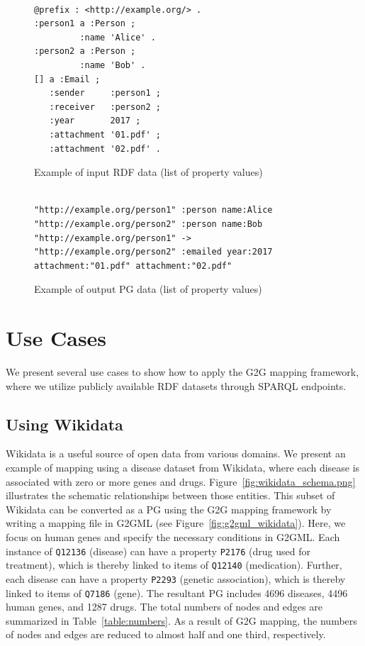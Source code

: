 \documentclass[runningheads]{llncs}
\begin{document}
\begin{figure}[!t]
\begin{scriptsize}
\begin{verbatim}

@prefix : <http://example.org/> .
:person1 a :Person ;
         :name 'Alice' .
:person2 a :Person ;
         :name 'Bob' .
[] a :Email ;
   :sender     :person1 ;
   :receiver   :person2 ;
   :year       2017 ;
   :attachment '01.pdf' ;
   :attachment '02.pdf' .

\end{verbatim}
\end{scriptsize}
\caption{Example of input RDF data (list of property values)}
\label{fig:example-rdf3}
\end{figure}


\begin{figure}[!t]
\begin{scriptsize}
\begin{verbatim}

"http://example.org/person1" :person name:Alice
"http://example.org/person2" :person name:Bob
"http://example.org/person1" -> "http://example.org/person2" :emailed year:2017 attachment:"01.pdf" attachment:"02.pdf"

\end{verbatim}
\end{scriptsize}
\caption{Example of output PG data (list of property values)}
\label{fig:example-pg3}
\end{figure}


\section{Use Cases}
 
We present several use cases to show how to apply the G2G mapping framework, where we utilize publicly available RDF datasets through SPARQL endpoints.

 
\subsection{Using Wikidata}
 
Wikidata is a useful source of open data from various domains.
We present an example of mapping using a disease dataset from Wikidata, 
where each disease is associated with zero or more genes and drugs.
Figure~\ref{fig:wikidata_schema.png} illustrates the schematic relationships between those entities. 
This subset of Wikidata can be converted as a PG using the G2G mapping framework by writing a mapping file in G2GML (see Figure~\ref{fig:g2gml_wikidata}).
Here, we focus on human genes and specify the necessary conditions in G2GML.
Each instance of \texttt{Q12136} (disease) can have a property \texttt{P2176} (drug used for treatment), which is thereby linked to items of \texttt{Q12140} (medication). Further, each disease can have a property \texttt{P2293} (genetic association), which is thereby linked to items of \texttt{Q7186} (gene).
The resultant PG includes 4696 diseases, 4496 human genes, and 1287 drugs. The total numbers of nodes and edges are summarized in Table~\ref{table:numbers}. As a result of G2G mapping, the numbers of nodes and edges are reduced to almost half and one third, respectively.
 
\end{document}
